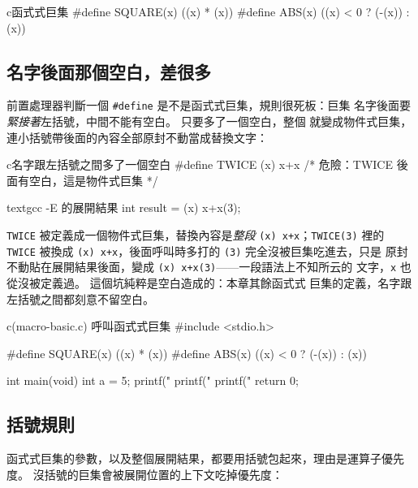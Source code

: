 \begin{code}{c}{函式式巨集}
#define SQUARE(x) ((x) * (x))
#define ABS(x) ((x) < 0 ? (-(x)) : (x))
\end{code}

\subsection{名字後面那個空白，差很多}

前置處理器判斷一個 \texttt{\#define} 是不是函式式巨集，規則很死板：巨集
名字後面要\textit{緊接著}左括號，中間不能有空白。 只要多了一個空白，整個
就變成物件式巨集，連小括號帶後面的內容全部原封不動當成替換文字：

\begin{code}{c}{名字跟左括號之間多了一個空白}
#define TWICE (x) x+x   /* 危險：TWICE 後面有空白，這是物件式巨集 */
\end{code}

\begin{code}{text}{gcc -E 的展開結果}
int result = (x) x+x(3);
\end{code}

\texttt{TWICE} 被定義成一個物件式巨集，替換內容是\textit{整段}
\texttt{(x) x+x}；\texttt{TWICE(3)} 裡的 \texttt{TWICE} 被換成
\texttt{(x) x+x}，後面呼叫時多打的 \texttt{(3)} 完全沒被巨集吃進去，只是
原封不動貼在展開結果後面，變成 \texttt{(x) x+x(3)}——一段語法上不知所云的
文字，\texttt{x} 也從沒被定義過。 這個坑純粹是空白造成的：本章其餘函式式
巨集的定義，名字跟左括號之間都刻意不留空白。

\begin{example}{c}{(macro-basic.c) 呼叫函式式巨集}
#include <stdio.h>

#define SQUARE(x) ((x) * (x))
#define ABS(x) ((x) < 0 ? (-(x)) : (x))

int main(void) {
    int a = 5;
    printf("%
    printf("%
    printf("%
    return 0;
}
\end{example}


\subsection{括號規則}

函式式巨集的參數，以及整個展開結果，都要用括號包起來，理由是運算子優先
度。 沒括號的巨集會被展開位置的上下文吃掉優先度：

